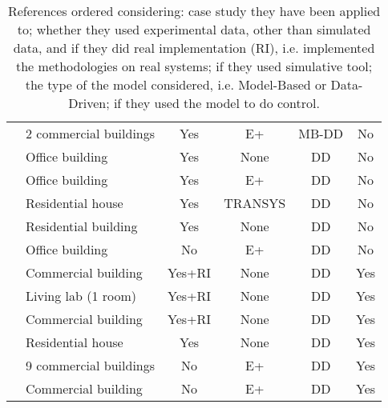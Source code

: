 {\begin{table}[t!]
{\begin{tabular}{llcccc}
		\cite{Li2016AE}                  & 2 commercial buildings  & Yes                 & E+                  & MB-DD             & No                \\
		\cite{Safa2017SCS}               & Office building         & Yes                 & None                & DD                & No                \\
		\cite{Neto2008EB}                & Office building         & Yes                 & E+                  & DD                & No                \\
		\cite{Magnier2010BE}             & Residential house       & Yes                 & TRANSYS             & DD                & No                \\
		\cite{Candanedo2017EB}           & Residential building    & Yes                 & None                & DD                & No                \\
		\cite{Ascione2017E}              & Office building         & No                  & E+                  & DD                & No                \\
		\cite{Macarulla2017}             & Commercial building     & Yes+RI              & None                & DD                & Yes               \\
		\cite{Costanzo2016}              & Living lab (1 room)     & Yes+RI              & None                & DD                & Yes               \\
		\cite{Ferreira2012}              & Commercial building     & Yes+RI              & None                & DD                & Yes               \\
		\cite{Afram2017}                 & Residential house       & Yes                 & None                & DD                & Yes               \\
		\cite{Behl2016}                  & 9 commercial buildings  & No                  & E+                  & DD                & Yes               \\
		\cite{Jain2017TCPS}              & Commercial building     & No                  & E+                  & DD                & Yes               \\
		\bottomrule
	\end{tabular}\normalsize}
	\caption{\textcolor[rgb]{0,0,1}{References ordered considering: case study they have been applied to; whether they used experimental data, other than simulated data, and if they did real implementation (RI), i.e. implemented the methodologies on real systems; if they used simulative tool; the type of the model considered, i.e. Model-Based or Data-Driven; if they used the model to do control.}}
	\captionsetup{justification=centering}
	\label{T:RelatedWork}
\end{table}
}

